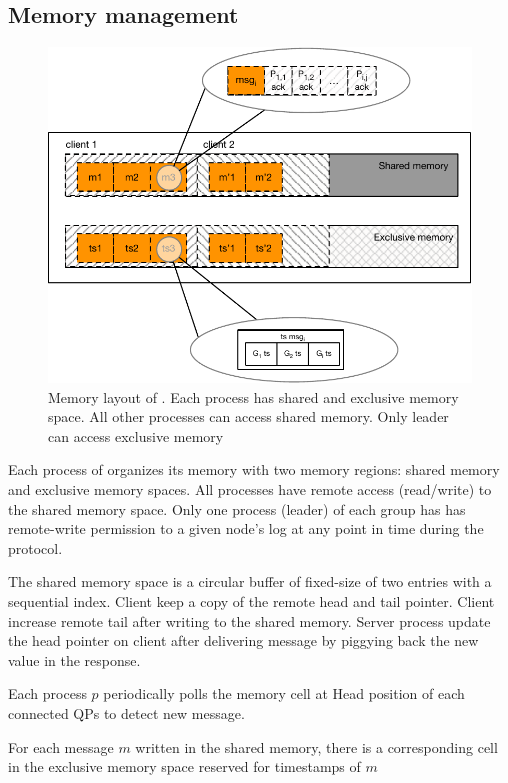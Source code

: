 \subsection{Memory management}

\begin{figure}[ht!]
  \centering
  \includegraphics[width=1\linewidth]{figures/memory}
  \caption{Memory layout of \libname. Each process has shared and exclusive memory
  space. All other processes can access shared memory. Only leader can access
  exclusive memory }
  \label{fig:normal_operation_time}
\end{figure}


Each process of \libname organizes its memory with two memory regions: shared
memory and exclusive memory spaces. All processes have remote access
(read/write) to the shared memory space. Only one process (leader) of each group
has has remote-write permission to a given node’s log at any point in time
during the protocol.

The shared memory space is a circular buffer of fixed-size of two entries with a
sequential index. Client keep a copy of the remote head and tail pointer. Client
increase remote tail after writing to the shared memory. Server process update
the head pointer on client after delivering message by piggying back the new
value in the response.

Each process $p$ periodically polls the memory cell at Head position of each
connected QPs to detect new message.

For each message $m$ written in the shared memory, there is a corresponding cell
in the exclusive memory space reserved for timestamps of $m$

